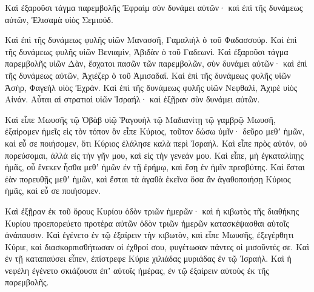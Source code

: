 {Καὶ ἐξαροῦσι τάγμα παρεμβολῆς Ἐφραὶμ σὺν δυνάμει αὐτῶν· καὶ ἐπὶ τῆς δυνάμεως αὐτῶν, Ἐλισαμὰ υἱὸς Σεμιούδ.
\par }{\PP {}Καὶ ἐπὶ τῆς δυνάμεως φυλῆς υἱῶν Μανασσῆ, Γαμαλιὴλ ὁ τοῦ Φαδασσούρ.
Καὶ ἐπὶ τῆς δυνάμεως φυλῆς υἱῶν Βενιαμὶν, Ἀβιδὰν ὁ τοῦ Γαδεωνί.
Καὶ ἐξαροῦσι τάγμα παρεμβολῆς υἱῶν Δὰν, ἔσχατοι πασῶν τῶν παρεμβολῶν, σὺν δυνάμει αὐτῶν· καὶ ἐπὶ τῆς δυνάμεως αὐτῶν, Ἀχιέζερ ὁ τοῦ Ἀμισαδαΐ.
Καὶ ἐπὶ τῆς δυνάμεως φυλῆς υἱῶν Ἀσὴρ, Φαγεὴλ υἱὸς Ἐχράν.
Καὶ ἐπὶ τῆς δυνάμεως φυλῆς υἱῶν Νεφθαλὶ, Ἀχιρὲ υἱὸς Αἰνάν.
Αὗται αἱ στρατιαὶ υἱῶν Ἰσραήλ· καὶ ἐξῇραν σὺν δυνάμει αὐτῶν.
\par }{\PP {}Καὶ εἶπε Μωυσῆς τῷ Ὀβὰβ υἱῷ Ῥαγουὴλ τῷ Μαδιανίτῃ τῷ γαμβρῷ Μωυσῆ, ἐξαίρομεν ἡμεῖς εἰς τὸν τόπον ὃν εἶπε Κύριος, τοῦτον δώσω ὑμῖν· δεῦρο μεθʼ ἡμῶν, καὶ εὖ σε ποιήσομεν, ὅτι Κύριος ἐλάλησε καλὰ περὶ Ἰσραήλ.
Καὶ εἶπε πρὸς αὐτόν, οὐ πορεύσομαι, ἀλλὰ εἰς τὴν γῆν μου, καὶ εἰς τὴν γενεάν μου.
Καὶ εἶπε, μὴ ἐγκαταλίπῃς ἡμᾶς, οὗ ἕνεκεν ἦσθα μεθʼ ἡμῶν ἐν τῇ ἐρήμῳ, καὶ ἔσῃ ἐν ἡμῖν πρεσβύτης.
Καὶ ἔσται ἐὰν πορευθῇς μεθʼ ἡμῶν, καὶ ἔσται τὰ ἀγαθὰ ἐκεῖνα ὅσα ἂν ἀγαθοποιήσῃ Κύριος ἡμᾶς, καὶ εὖ σε ποιήσομεν.
\par }{\PP {}Καὶ ἐξῇραν ἐκ τοῦ ὄρους Κυρίου ὁδὸν τριῶν ἡμερῶν· καὶ ἡ κιβωτὸς τῆς διαθήκης Κυρίου προεπορεύετο προτέρα αὐτῶν ὁδὸν τριῶν ἡμερῶν κατασκέψασθαι αὐτοῖς ἀνάπαυσιν.
Καὶ ἐγένετο ἐν τῷ ἐξαίρειν τὴν κιβωτὸν, καὶ εἶπε Μωυσῆς, ἐξεγέρθητι Κύριε, καὶ διασκορπισθήτωσαν οἱ ἐχθροί σου, φυγέτωσαν πάντες οἱ μισοῦντές σε.
Καὶ ἐν τῇ καταπαύσει εἶπεν, ἐπίστρεφε Κύριε χιλιάδας μυριάδας ἐν τῷ Ἰσραήλ.
Καὶ ἡ νεφέλη ἐγένετο σκιάζουσα ἐπʼ αὐτοῖς ἡμέρας, ἐν τῷ ἐξαίρειν αὐτοὺς ἐκ τῆς παρεμβολῆς.

}
